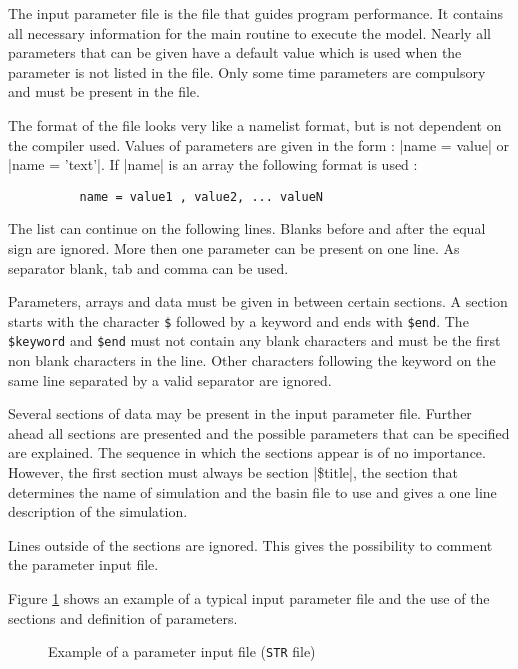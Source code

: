 \documentclass{report}
\begin{document}
The input parameter file is the file that guides program
performance. It contains all necessary information for the main routine
to execute the model. Nearly all parameters that can
be given have a default value which is used when the parameter
is not listed in the file. Only some time parameters are compulsory
and must be present in the file.

The format of the file looks very like a namelist format, but is
not dependent on the compiler used. Values of parameters are given
in the form :  
|name = value|  or  |name = 'text'|.  If |name|
is an array the following format is used : 
\begin{verbatim}
          name = value1 , value2, ... valueN
\end{verbatim}
The list can continue on the following lines. Blanks before and after
the equal sign are ignored. More then one parameter can be present
on one line. As separator blank, tab and comma can be used.

Parameters, arrays and data must be given in between certain sections.
A section starts with the character {\tt \$} followed by a keyword and
ends with {\tt \$end}. The {\tt \$keyword} and {\tt \$end} must not
contain any blank characters and must be the first non blank characters
in the line. Other characters following the keyword on the same line
separated by a valid separator are ignored.

Several sections of data may be present in the input parameter file.
Further ahead all sections are presented and the possible
parameters that can be specified are explained. The sequence in
which the sections appear is of no importance. However, the first 
section must always be section |\$title|, the section that
determines the name of simulation and the basin file to use and
gives a one line description of the simulation.

Lines outside of the sections are ignored. This gives
the possibility to comment the parameter input file.

Figure \ref{fig:str_example} shows an example of a typical input
parameter file and the use of the sections and definition of
parameters.

\begin{figure}
\begin{alltt}

\end{alltt}
\caption{Example of a parameter input file ({\tt STR} file)}
\label{fig:str_example}
\end{figure}
\end{document}
